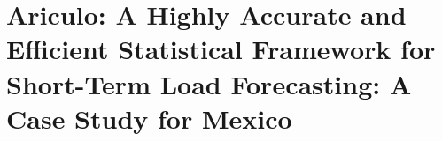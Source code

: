 \section{Ariculo: A Highly Accurate and Efficient Statistical Framework for Short-Term Load Forecasting: A Case Study for Mexico}

